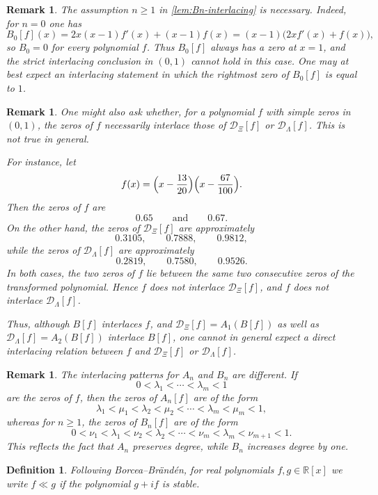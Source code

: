 \documentclass[11pt,twoside]{article}
\newtheorem{remark}[theorem]{Remark}
\newtheorem{definition}[theorem]{Definition}
\numberwithin{equation}{section}
\begin{document}
\begin{remark}
The assumption \(n\ge 1\) in \cref{lem:Bn-interlacing} is necessary. Indeed, for \(n=0\) one has
\[
B_0[f](x)=2x(x-1)f'(x)+(x-1)f(x)=(x-1)\bigl(2x f'(x)+f(x)\bigr),
\]
so \(B_0=0\) for every polynomial \(f\). Thus \(B_0[f]\) always has a zero at \(x=1\), and the strict interlacing conclusion in \((0,1)\) cannot hold in this case. One may at best expect an interlacing statement in which the rightmost zero of \(B_0[f]\) is equal to \(1\).
\end{remark}

\begin{remark}
One might also ask whether, for a polynomial \(f\) with simple zeros in \((0,1)\), the zeros of \(f\) necessarily interlace those of \(\mathcal D_{\Xi}[f]\) or \(\mathcal D_{\Lambda}[f]\). This is not true in general.

For instance, let
\[
f(x)=\Bigl(x-\frac{13}{20}\Bigr)\Bigl(x-\frac{67}{100}\Bigr).
\]
Then the zeros of \(f\) are
\[
0.65 \qquad \text{and} \qquad 0.67.
\]
On the other hand, the zeros of \(\mathcal D_{\Xi}[f]\) are approximately
\[
0.3105,\qquad 0.7888,\qquad 0.9812,
\]
while the zeros of \(\mathcal D_{\Lambda}[f]\) are approximately
\[
0.2819,\qquad 0.7580,\qquad 0.9526.
\]
In both cases, the two zeros of \(f\) lie between the same two consecutive zeros of the transformed polynomial. Hence \(f\) does not interlace \(\mathcal D_{\Xi}[f]\), and \(f\) does not interlace \(\mathcal D_{\Lambda}[f]\).

Thus, although \(B[f]\) interlaces \(f\), and \(\mathcal D_{\Xi}[f]=A_1(B[f])\) as well as \(\mathcal D_{\Lambda}[f]=A_2(B[f])\) interlace \(B[f]\), one cannot in general expect a direct interlacing relation between \(f\) and \(\mathcal D_{\Xi}[f]\) or \(\mathcal D_{\Lambda}[f]\).
\end{remark}

\begin{remark}
The interlacing patterns for \(A_n\) and \(B_n\) are different. If
\[
0<\lambda_1<\cdots<\lambda_m<1
\]
are the zeros of \(f\), then the zeros of \(A_n[f]\) are of the form
\[
\lambda_1<\mu_1<\lambda_2<\mu_2<\cdots<\lambda_m<\mu_m<1,
\]
whereas for \(n\ge 1\), the zeros of \(B_n[f]\) are of the form
\[
0<\nu_1<\lambda_1<\nu_2<\lambda_2<\cdots<\nu_m<\lambda_m<\nu_{m+1}<1.
\]
This reflects the fact that \(A_n\) preserves degree, while \(B_n\) increases degree by one.
\end{remark}

\begin{definition}
Following Borcea--Br\"and\'en, for real polynomials \(f,g\in\mathbb R[x]\) we write
\(
f\ll g
\)
if the polynomial
\(
g+i f
\)
is stable.
\end{definition}
\end{document}
